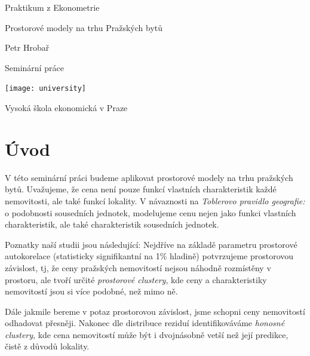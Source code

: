 \documentclass[11pt, a4paper]{article}
\begin{document}
\begin{titlepage}
\begin{center}
\vspace*{1cm}

\Huge
Praktikum z Ekonometrie

\vspace{0.5cm}
\LARGE
Prostorové modely na trhu Pražských bytů

\vspace{2.5cm}

Petr Hrobař

\vfill

Seminární práce

\vspace{0.8cm}

\texttt{[image: university]}

\Large
Vysoká škola ekonomická v Praze\\

\end{center}
\end{titlepage}


\clearpage

\tableofcontents

\clearpage

\section{Úvod}

V této seminární práci budeme aplikovat prostorové modely na trhu pražských bytů. Uvažujeme, že cena není pouze funkcí vlastních charakteristik každé nemovitosti, ale také funkcí lokality. V návaznosti na \textit{Toblerovo pravidlo geografie:} o podobnosti sousedních jednotek, modelujeme cenu nejen jako funkci vlastních charakteristik, ale také charakteristik sousedních jednotek. 

Poznatky naší studii jsou následující: Nejdříve na základě parametru prostorové autokorelace (statisticky signifikantní na 1\% hladině) potvrzujeme prostorovou závislost, tj, že ceny pražských nemovitostí nejsou náhodně rozmístěny v prostoru, ale tvoří určité \textit{prostorové clustery}, kde ceny a charakteristiky nemovitostí jsou si více podobné, než mimo ně. 

Dále jakmile bereme v potaz prostorovou závislost, jsme schopni ceny nemovitostí odhadovat přesněji. Nakonec dle distribuce reziduí identifikováváme \textit{honosné clustery}, kde cena nemovitostí může být i dvojnásobně vetší než její predikce, čistě z důvodů lokality.
\end{document}
